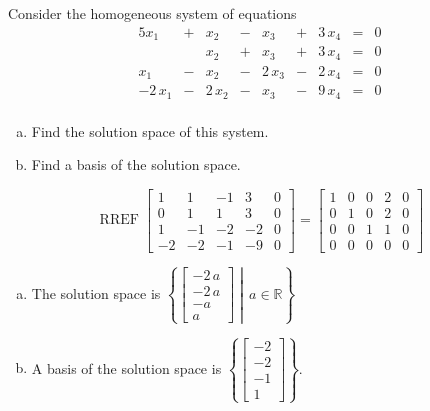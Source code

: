 
\begin{exerciseStatement}


Consider the homogeneous system of equations 
\begin{alignat*}{5} x_{1} &+& x_{2} &-& x_{3} &+& 3 \, x_{4} &=& 0 \\ & & x_{2} &+& x_{3} &+& 3 \, x_{4} &=& 0 \\x_{1} &-& x_{2} &-& 2 \, x_{3} &-& 2 \, x_{4} &=& 0 \\-2 \, x_{1} &-& 2 \, x_{2} &-& x_{3} &-& 9 \, x_{4} &=& 0 \\ \end{alignat*}
            


\begin{enumerate}[(a)]
\item  Find the solution space of this system.
\item  Find a basis of the solution space.
\end{enumerate}
    
\end{exerciseStatement}
    
\begin{exerciseAnswer} 


\[\operatorname{RREF} \left[\begin{array}{cccc|c}
1 & 1 & -1 & 3 & 0 \\
0 & 1 & 1 & 3 & 0 \\
1 & -1 & -2 & -2 & 0 \\
-2 & -2 & -1 & -9 & 0
\end{array}\right] = \left[\begin{array}{cccc|c}
1 & 0 & 0 & 2 & 0 \\
0 & 1 & 0 & 2 & 0 \\
0 & 0 & 1 & 1 & 0 \\
0 & 0 & 0 & 0 & 0
\end{array}\right] \]


\begin{enumerate}[(a)]
\item The solution space is \( \left\{ \left[\begin{array}{c}
-2 \, a \\
-2 \, a \\
-a \\
a
\end{array}\right] \middle|\,a\in\mathbb{R}\right\} \)
\item A basis of the solution space is \( \left\{ \left[\begin{array}{c}
-2 \\
-2 \\
-1 \\
1
\end{array}\right] \right\} \).
\end{enumerate}
    
\end{exerciseAnswer}
    

